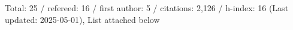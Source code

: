 Total: 25 / refereed: 16 / first author: 5 / citations: 2,126 / h-index: 16 (Last updated: 2025-05-01), List attached below
